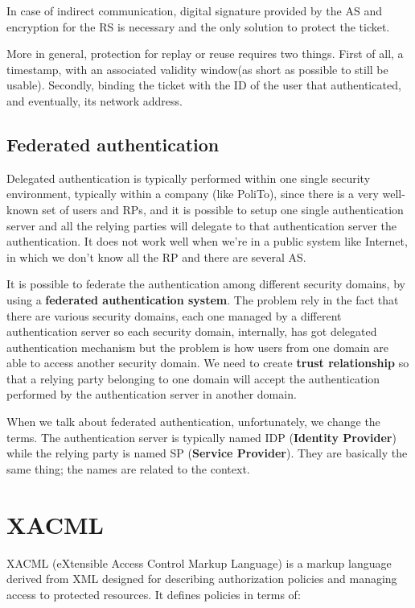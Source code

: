 In case of indirect communication, digital signature provided by the
AS and encryption for the RS is necessary and the only solution to 
protect the ticket.

More in general, protection for replay or reuse requires two things.
First of all, a timestamp, with an associated validity window(as short
as possible to still be usable). Secondly, binding the ticket with the
ID of the user that authenticated, and eventually, its network
address.

\subsection{Federated authentication}

Delegated authentication is typically performed within one single
security environment, typically within a company (like PoliTo), since
there is a very well-known set of users and RPs, and it is possible to
setup one single authentication server and all the relying parties
will delegate to that authentication server the authentication. It
does not work well when we’re in a public system like Internet, in
which we don’t know all the RP and there are several AS.

It is possible to federate the authentication among different security
domains, by using a \textbf{federated authentication system}. The
problem rely in the fact that there are various security domains, each
one managed by a different authentication server so each security
domain, internally, has got delegated authentication mechanism but the
problem is how users from one domain are able to access another
security domain. We need to create \textbf{trust relationship} so that
a relying party belonging to one domain will accept the authentication
performed by the authentication server in another domain. 

When we talk about federated authentication, unfortunately, we change
the terms. The authentication server is typically named IDP
(\textbf{Identity Provider}) while the relying party is named SP
(\textbf{Service Provider}). They are basically the same thing; the
names are related to the context.

\section{XACML}
XACML (eXtensible Access Control Markup Language) is a markup language
derived from XML designed for describing authorization policies and
managing access to protected resources. It defines policies in terms
of:

